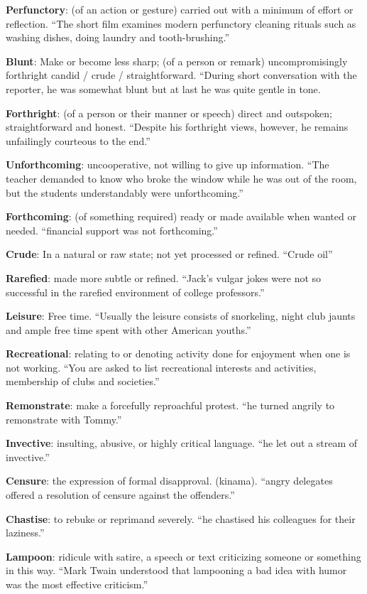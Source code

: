 \documentclass[12pt, a4paper]{ximera}
\begin{document}
\textbf{Perfunctory}: (of an action or gesture) carried out with a minimum of effort or reflection. ``The short film examines modern perfunctory cleaning rituals such as washing dishes, doing laundry and tooth-brushing.''

\textbf{Blunt}: Make or become less sharp; (of a person or remark) uncompromisingly forthright candid / crude / straightforward. ``During short conversation with the reporter, he was somewhat blunt but at last he was quite gentle in tone.

\textbf{Forthright}: (of a person or their manner or speech) direct and outspoken; straightforward and honest. ``Despite his forthright views, however, he remains unfailingly courteous to the end.''

\textbf{Unforthcoming}: uncooperative, not willing to give up information. ``The teacher demanded to know who broke the window while he was out of the room, but the students understandably were unforthcoming.''

\textbf{Forthcoming}: (of something required) ready or made available when wanted or needed. ``financial support was not forthcoming.''

\textbf{Crude}: In a natural or raw state; not yet processed or refined. ``Crude oil''

\textbf{Rarefied}: made more subtle or refined. ``Jack's vulgar jokes were not so successful in the rarefied environment of college professors.''

\textbf{Leisure}: Free time. ``Usually the leisure consists of snorkeling, night club jaunts and ample free time spent with other American youths.''

\textbf{Recreational}: relating to or denoting activity done for enjoyment when one is not working. ``You are asked to list recreational interests and activities, membership of clubs and societies.''

\textbf{Remonstrate}: make a forcefully reproachful protest. ``he turned angrily to remonstrate with Tommy.''

\textbf{Invective}: insulting, abusive, or highly critical language. ``he let out a stream of invective.''

\textbf{Censure}: the expression of formal disapproval. (kinama). ``angry delegates offered a resolution of censure against the offenders.''

\textbf{Chastise}: to rebuke or reprimand severely. ``he chastised his colleagues for their laziness.''

\textbf{Lampoon}: ridicule with satire, a speech or text criticizing someone or something in this way. ``Mark Twain understood that lampooning a bad idea with humor was the most effective criticism.''
\end{document}
